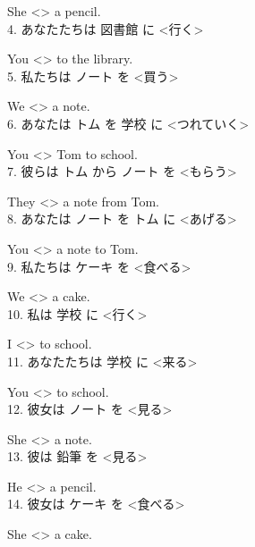 \documentclass[uplatex,
paper=a4,
fontsize=18pt,
jafontsize=16pt,
number_of_lines=30,
line_length=30zh,
baselineskip=25pt,
]{jlreq}
\begin{document}
  She <\hspace{3em}> a pencil.
\\

4.  あなたたちは 図書館 に <行く>

  You <\hspace{3em}> to the library.
\\

5.  私たちは ノート を <買う>

  We <\hspace{3em}> a note.
\\

6.  あなたは トム を 学校 に <つれていく>

  You <\hspace{3em}> Tom to school.
\\

7.  彼らは トム から ノート を <もらう>

  They <\hspace{3em}> a note from Tom.
\\

8.  あなたは ノート を トム に <あげる>

  You <\hspace{3em}> a note to Tom.
\\

9.  私たちは ケーキ を <食べる>

  We <\hspace{3em}> a cake.
\\

10.  私は 学校 に <行く>

  I <\hspace{3em}> to school.
\\

11.  あなたたちは 学校 に <来る>

  You <\hspace{3em}> to school.
\\

12.  彼女は ノート を <見る>

  She <\hspace{3em}> a note.
\\

13.  彼は 鉛筆 を <見る>

  He <\hspace{3em}> a pencil.
\\

14.  彼女は ケーキ を <食べる>

  She <\hspace{3em}> a cake.
\\
\end{document}
